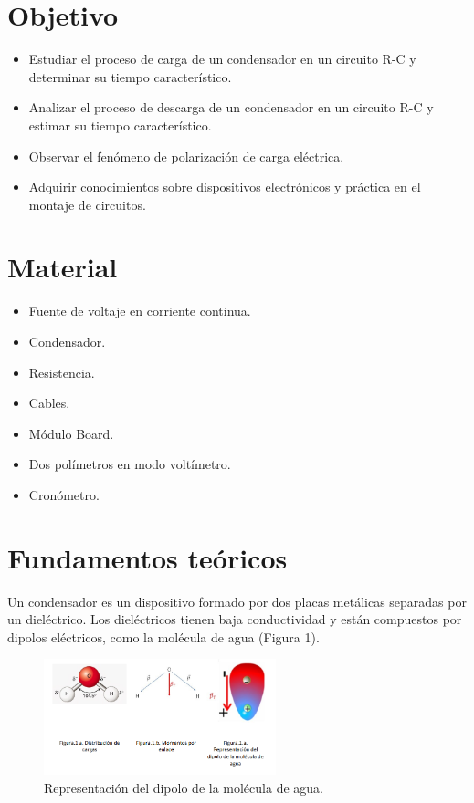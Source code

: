 \documentclass{article}
\begin{document}
\maketitle
\tableofcontents
\newpage

\section{Objetivo}
\begin{itemize}
    \item Estudiar el proceso de carga de un condensador en un circuito R-C y determinar su tiempo característico.
    \item Analizar el proceso de descarga de un condensador en un circuito R-C y estimar su tiempo característico.
    \item Observar el fenómeno de polarización de carga eléctrica.
    \item Adquirir conocimientos sobre dispositivos electrónicos y práctica en el montaje de circuitos.
\end{itemize}

\section{Material}
\begin{itemize}
    \item Fuente de voltaje en corriente continua.
    \item Condensador.
    \item Resistencia.
    \item Cables.
    \item Módulo Board.
    \item Dos polímetros en modo voltímetro.
    \item Cronómetro.
\end{itemize}

\section{Fundamentos teóricos}
Un condensador es un dispositivo formado por dos placas metálicas separadas por un dieléctrico. Los dieléctricos tienen baja conductividad y están compuestos por dipolos eléctricos, como la molécula de agua (Figura 1). 

\begin{figure}[h]
    \centering
    \includegraphics[width=0.6\textwidth]{dipolo_agua.png}
    \caption{Representación del dipolo de la molécula de agua.}
    \label{fig:dipolo}
\end{figure}
\end{document}
